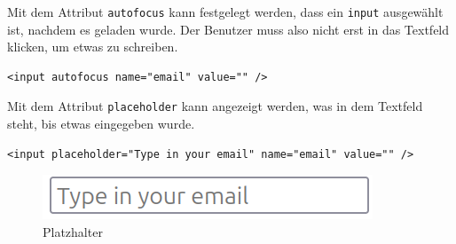 \documentclass[a4paper]{scrartcl}
\begin{document}
Mit dem Attribut \texttt{autofocus} kann festgelegt werden, dass ein \texttt{input} ausgewählt ist, nachdem es geladen wurde.
Der Benutzer muss also nicht erst in das Textfeld klicken, um etwas zu schreiben.

\begin{verbatim}
<input autofocus name="email" value="" />
\end{verbatim}


Mit dem Attribut \texttt{placeholder} kann angezeigt werden, was in dem Textfeld steht, bis etwas eingegeben wurde.

\begin{verbatim}
<input placeholder="Type in your email" name="email" value="" />
\end{verbatim}

\begin{figure}[H]
\centering
\includegraphics[width=0.5\linewidth]{placeholder}
\caption{Platzhalter}
\label{fig:placeholder}
\end{figure}
\end{document}
